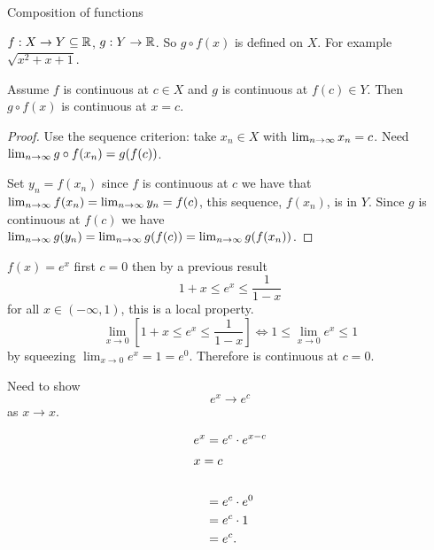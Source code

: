 \documentclass[10pt, a4paper]{article}
\begin{document}
Composition of functions

$f : X \rightarrow Y \subseteq \mathbb{R}$,
$g : Y \rightarrow \mathbb{R}$.
So $g \circ f(x)$ is defined on $X$.
For example $\sqrt{x ^ 2 + x + 1}$.

\begin{proposition}
    Assume $f$ is continuous at $c \in X$ and $g$ is continuous at $f(c) \in Y$.
    Then $g \circ f(x)$ is continuous at $x = c$.
    \begin{proof}
        Use the sequence criterion:
        take $x_n \in X$ with $\lim_{n \rightarrow \infty} x_n = c$.
        Need $\lim_{n \rightarrow \infty} g \circ f(x_n) = g(f(c))$.
        
        Set $y_n = f(x_n)$ since $f$ is continuous at $c$ we have that $\lim_{n \rightarrow \infty} f(x_n) = \lim_{n \rightarrow \infty} y_n = f(c)$,
        this sequence,
        $f(x_n)$,
        is in $Y$.
        Since $g$ is continuous at $f(c)$ we have $\lim_{n \rightarrow \infty} g(y_n) = \lim_{n \rightarrow \infty} g(f(c)) = \lim_{n \rightarrow \infty} g(f(x_n))$.
    \end{proof}
\end{proposition}

\begin{example}
    $f(x) = e ^ x$ first $c = 0$ then by a previous result
    \[
    1 + x \leq e ^ x \leq \frac{1}{1 - x}
    \]
    for all $x \in (-\infty, 1)$,
    this is a local property.
    \[
    \lim_{x \rightarrow 0}\left[1 + x \leq e ^ x \leq \frac{1}{1 - x}\right] \iff 1 \leq \lim_{x \rightarrow 0}e ^ x \leq 1
    \]
    by squeezing $\lim_{x \rightarrow 0}e ^ x = 1 = e ^ 0$.
    Therefore is continuous at $c = 0$.

    Need to show
    \[
    e ^ x \rightarrow e ^ c
    \]
    as $x \rightarrow x$.

    \begin{align*}
        e ^ x &= e ^ c \cdot e ^ {x - c} \\
        \intertext{$x = c$} \\
        &= e ^ c \cdot e ^ 0 \\
        &= e ^ c \cdot 1 \\
        &= e ^ c.
    \end{align*}
\end{example}
\end{document}

